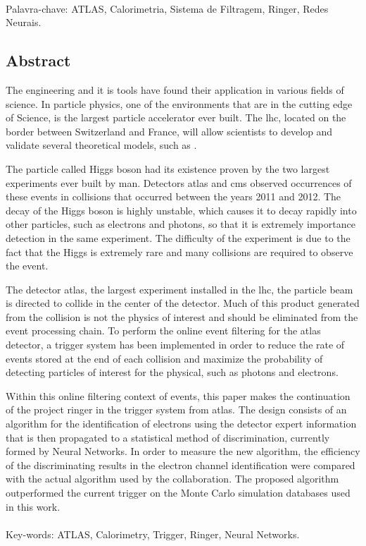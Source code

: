 \paragraph*{}

\noindent Palavra-chave: ATLAS, Calorimetria, Sistema de Filtragem, Ringer, Redes Neurais.

\vfill

\clearpage

\vfill
\begin{center}
\section*{Abstract\label{Abstract}}
\end{center}

The engineering and  it is tools have found their application in various fields of science.
In particle physics, one of the environments that are in the cutting edge of Science, is
the largest particle accelerator ever built. The \acrshort{lhc}, located on the border
between Switzerland and France, will allow scientists to develop and validate several theoretical models, such as 
.

The particle called Higgs boson had its existence proven by the two largest
experiments ever built by man. Detectors \acrshort{atlas} and \acrshort{cms} observed
occurrences of these events in collisions that occurred between the years 2011 and 2012. The decay of the 
Higgs boson is highly unstable, which causes it to decay rapidly into other particles, such as electrons and
photons, so that it is extremely importance detection in the same experiment. The difficulty of the experiment 
is due to the fact that the Higgs is extremely rare and many collisions are required to observe the event.

The detector \acrshort{atlas}, the largest experiment installed in the \acrshort{lhc}, the particle beam
is directed to collide in the center of the detector. Much of this product generated from
the collision is not the physics of interest and should be eliminated from the event processing chain. 
To perform the online event filtering for the \acrshort{atlas} detector, a trigger system has been implemented
 in order to reduce the rate of events stored at the end of each collision and maximize
the probability of detecting particles of interest for the physical, such as photons and electrons.

Within this online filtering context of events, this paper makes the continuation of the project
\acrshort{ringer} in the \acrshort{trigger} system from \acrshort{atlas}. The design consists of an algorithm 
for the identification of electrons using the detector expert information that is then propagated to a statistical 
method of discrimination, currently formed by Neural Networks. In order to measure the new algorithm,
 the efficiency of the discriminating results in the electron channel identification were compared with the actual 
 algorithm used by the collaboration. The proposed algorithm outperformed the current trigger on the Monte Carlo
  simulation databases used in this work.

\paragraph*{}

\noindent Key-words: ATLAS, Calorimetry, Trigger, Ringer,  Neural Networks.

\vfill
\clearpage
